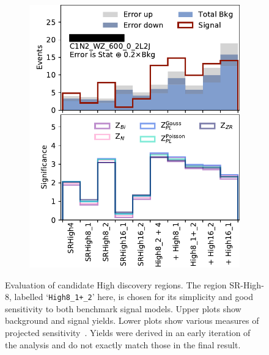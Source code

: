 \begin{figure}[tp]
\begin{subfigure}{0.48\textwidth}
\includegraphics[width=\textwidth]{figures/2ljets_disco_High_C1N2_WZ_600_0_2L2J.png}
\caption{}
\end{subfigure}
\caption[
Evaluation of candidate High discovery regions
]{%
Evaluation of candidate High discovery regions.
The region SR-High-8, labelled `\texttt{High8\_1+\_2}' here, is chosen for its
simplicity and good sensitivity to both benchmark signal models.
Upper plots show background and signal yields.
Lower plots show various measures of projected
sensitivity~\cite{cousins2008evaluation}.
Yields were derived in an early iteration of the analysis and do not exactly
match those in the final result.
}
\label{fig:2ljets_disco_trials_high}
\end{figure}

